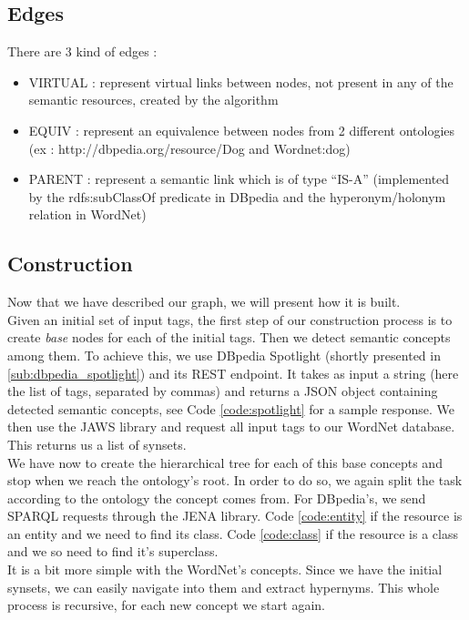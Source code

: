 \subsection{Edges} %
\label{sub:edges}
There are 3 kind of edges :
\begin{itemize}
	\item VIRTUAL : represent virtual links between nodes, not present in any of the semantic resources, created by the algorithm
	\item EQUIV : represent an equivalence between nodes from 2 different ontologies \\
	(ex : http://dbpedia.org/resource/Dog and Wordnet:dog)
	\item PARENT : represent a semantic link which is of type “IS-A” (implemented by the rdfs:subClassOf predicate in DBpedia and the hyperonym/holonym relation in WordNet)
\end{itemize}

\subsection{Construction} %
\label{sub:construction}
Now that we have described our graph, we will present how it is built.\\

Given an initial set of input tags, the first step of our construction process is to create \emph{base} nodes for each of the initial tags. Then we detect semantic concepts among them. To achieve this, we use DBpedia Spotlight (shortly presented in \ref{sub:dbpedia_spotlight}) and its REST endpoint. It takes as input a string (here the list of tags, separated by commas) and returns a JSON object containing detected semantic concepts, see Code \ref{code:spotlight} for a sample response. We then use the JAWS library and request all input tags to our WordNet database. This returns us a list of synsets.\\


We have now to create the hierarchical tree for each of this base concepts and stop when we reach the ontology's root. In order to do so, we again split the task according to the ontology the concept comes from. For DBpedia's, we send SPARQL requests through the JENA library. Code \ref{code:entity} if the resource is an entity and we need to find its class. Code \ref{code:class} if the resource is a class and we so need to find it's superclass.\\


It is a bit more simple with the WordNet's concepts. Since we have the initial synsets, we can easily navigate into them and extract hypernyms. This whole process is recursive, for each new concept we start again.\\

